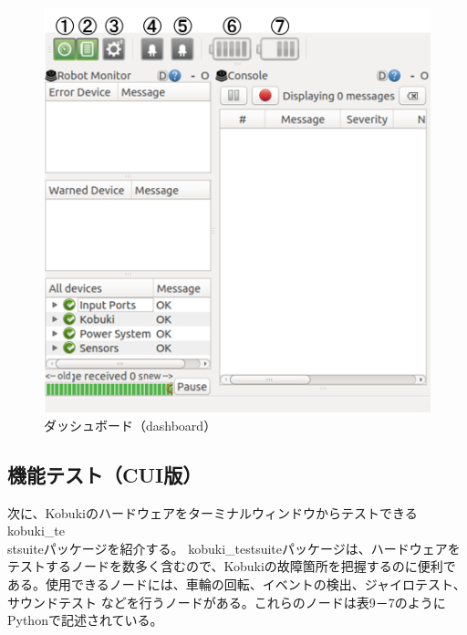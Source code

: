 \begin{itemize}
\begin{figure}[htp]
  \centering
  \includegraphics[width=12cm]{pictures/chapter9/pic_09_15.png}
  \caption{ダッシュボード（dashboard）}
\end{figure}

\subsection{機能テスト（CUI版）}

次に、Kobukiのハードウェアをターミナルウィンドウからテストできるkobuki\_te\\stsuiteパッケージを紹介する。
kobuki\_testsuiteパッケージは、ハードウェアをテストするノードを数多く含むので、Kobukiの故障箇所を把握するのに便利である。使用できるノードには、車輪の回転、イベントの検出、ジャイロテスト、サウンドテスト  などを行うノードがある。これらのノードは表9－7のようにPythonで記述されている。


\end{itemize}
